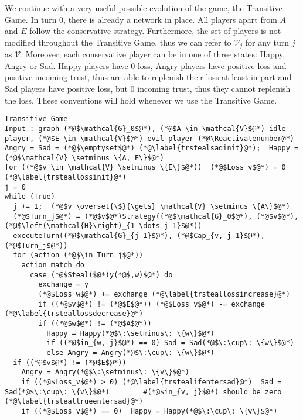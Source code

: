 \documentclass[11pt]{llncs}
\makeatletter
\newcommand*\Suppressnumber{%
  \lst@AddToHook{OnNewLine}{%
    \let\thelstnumber\relax%
     \advance\c@lstnumber-\@ne\relax%
    }%
}
\theoremstyle{definition}
\makeatother
\begin{document}
     We continue with a very useful possible evolution of the game, the Transitive Game. In turn 0, there is already a network
     in place. All players apart from $A$ and $E$ follow the conservative strategy. Furthermore, the set of players is not
     modified throughout the Transitive Game, thus we can refer to $\mathcal{V}_j$ for any turn $j$ as $\mathcal{V}$.
     Moreover, each conservative player can be in one of three states: Happy, Angry or Sad. Happy players have 0 loss, Angry
     players have positive loss and positive incoming trust, thus are able to replenish their loss at least in part and
     Sad players have positive loss, but 0 incoming trust, thus they cannot replenish the loss. These conventions will hold
     whenever we use the Transitive Game.
     \Suppressnumber
     \begin{lstlisting}[label=transitivegame, style=numbers]
Transitive Game
Input : graph (*@$\mathcal{G}_0$@*), (*@$A \in \mathcal{V}$@*) idle player, (*@$E \in \mathcal{V}$@*) evil player (*@\Reactivatenumber@*)
Angry = Sad = (*@$\emptyset$@*) (*@\label{trstealsadinit}@*);  Happy = (*@$\mathcal{V} \setminus \{A, E\}$@*)
for ((*@$v \in \mathcal{V} \setminus \{E\}$@*))  (*@$Loss_v$@*) = 0 (*@\label{trsteallossinit}@*)
j = 0
while (True)
  j += 1;  (*@$v \overset{\$}{\gets} \mathcal{V} \setminus \{A\}$@*)
  (*@$Turn_j$@*) = (*@$v$@*)Strategy((*@$\mathcal{G}_0$@*), (*@$v$@*), (*@$\left(\mathcal{H}\right)_{1 \dots j-1}$@*))
  executeTurn((*@$\mathcal{G}_{j-1}$@*), (*@$Cap_{v, j-1}$@*), (*@$Turn_j$@*))
  for (action (*@$\in Turn_j$@*))
    action match do
      case (*@$Steal($@*)y(*@$,w)$@*) do
        exchange = y
        (*@$Loss_w$@*) += exchange (*@\label{trsteallossincrease}@*)
        if ((*@$v$@*) != (*@$E$@*)) (*@$Loss_v$@*) -= exchange (*@\label{trsteallossdecrease}@*)
        if ((*@$w$@*) != (*@$A$@*))
          Happy = Happy(*@$\:\setminus\: \{w\}$@*)
          if ((*@$in_{w, j}$@*) == 0) Sad = Sad(*@$\:\cup\: \{w\}$@*)
          else Angry = Angry(*@$\:\cup\: \{w\}$@*)
  if ((*@$v$@*) != (*@$E$@*))
    Angry = Angry(*@$\:\setminus\: \{v\}$@*)
    if ((*@$Loss_v$@*) > 0) (*@\label{trstealifentersad}@*)  Sad = Sad(*@$\:\cup\: \{v\}$@*)        #(*@$in_{v, j}$@*) should be zero (*@\label{trstealtrueentersad}@*)
    if ((*@$Loss_v$@*) == 0)  Happy = Happy(*@$\:\cup\: \{v\}$@*)
     \end{lstlisting}
\end{document}
